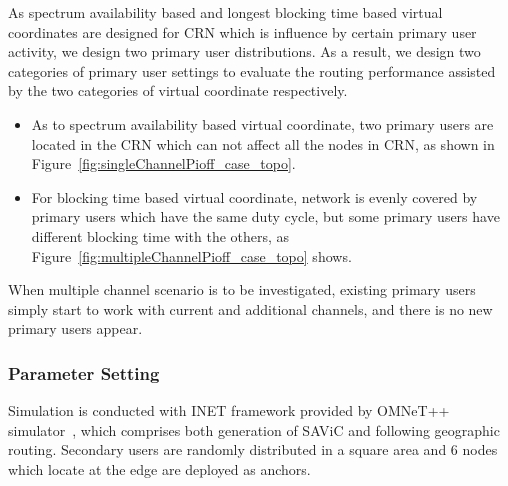As spectrum availability based and longest blocking time based virtual coordinates are designed for CRN which is influence by certain primary user activity, we design two primary user distributions.
As a result, we design two categories of primary user settings to evaluate the routing performance assisted by the two categories of virtual coordinate respectively.
\begin{itemize}
\item As to spectrum availability based virtual coordinate, two primary users are located in the CRN which can not affect all the nodes in CRN, as shown in Figure~\ref{fig:singleChannelPioff_case_topo}.
\item For blocking time based virtual coordinate, network is evenly covered by primary users which have the same duty cycle, but some primary users have different blocking time with the others, as Figure~\ref{fig:multipleChannelPioff_case_topo} shows.
\end{itemize}
When multiple channel scenario is to be investigated, existing primary users simply start to work with current and additional channels, and there is no new primary users appear.



\subsubsection*{Parameter Setting}
Simulation is conducted with INET framework provided by OMNeT++ simulator~\cite{omnetpp_paper08}, which comprises both generation of SAViC and following geographic routing. 
Secondary users are randomly distributed in a square area and 6 nodes which locate at the edge are deployed as anchors.

